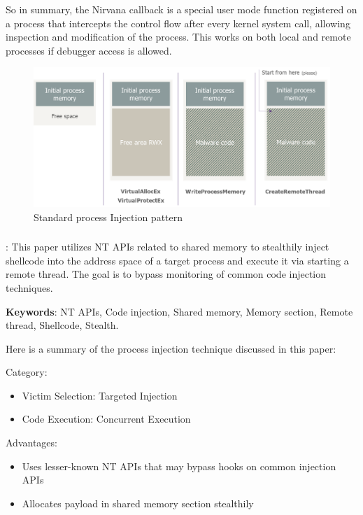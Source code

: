 \documentclass{article}
\begin{document}
  So in summary, the Nirvana callback is a special user mode function registered on a process that intercepts the control flow after every kernel system call, allowing inspection and modification of the process. This works on both local and remote processes if debugger access is allowed.


\begin{figure}[h]
\includegraphics[scale=0.9]{dequeker_standard_process_injection_pattern.png}
\caption{Standard process Injection pattern \autocite{Dequeker:2023}}
\end{figure}
 

\subsubsection{\textcite{S12h4ck:2023a}}
\textbf{}:  This paper utilizes NT APIs related to shared memory to stealthily inject shellcode into the address space of a target process and execute it via starting a remote thread. The goal is to bypass monitoring of common code injection techniques.

\textbf{Keywords}: NT APIs, Code injection, Shared memory, Memory section, Remote thread, Shellcode, Stealth.

Here is a summary of the process injection technique discussed in this paper:

Category:
\begin{itemize}
\item Victim Selection: Targeted Injection
\item Code Execution: Concurrent Execution
\end{itemize}

Advantages:
\begin{itemize}
\item Uses lesser-known NT APIs that may bypass hooks on common injection APIs
\item Allocates payload in shared memory section stealthily
\end{itemize}
\end{document}
